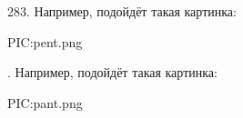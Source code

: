 283. Например, подойдёт такая картинка:
\begin{center}
{{PIC:pent.png}}
\end{center}\newpage
{}. Например, подойдёт такая картинка:
\begin{center}
{{PIC:pant.png}}
\end{center}
